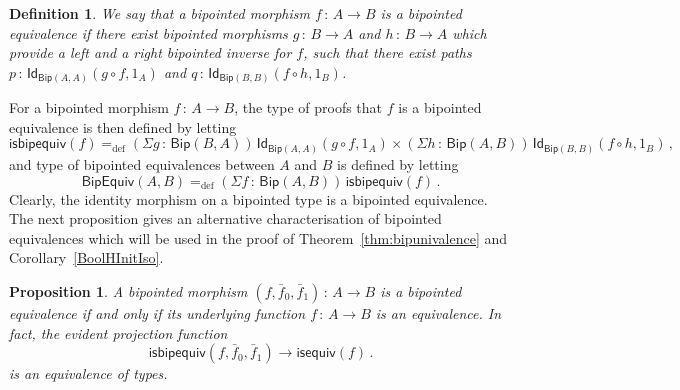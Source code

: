 \documentclass[10pt,a4paper,oneside,reqno]{amsart}
\numberwithin{equation}{section}
\theoremstyle{mythm}
\newtheorem{proposition}[theorem]{Proposition}
\theoremstyle{mydef}
\newtheorem{definition}[theorem]{Definition}
\theoremstyle{myrmk}
\newcommand{\ie}{\text{i.e.\ }}
\newcommand{\myemph}[1]{\textit{#1}}
\newcommand{\defeq}{=_{\mathrm{def}}}
\newcommand{\co}{\,{:}\,}
\newcommand{\isequiv}{\mathsf{isequiv}}
\newcommand{\Id}{\mathsf{Id}}
\newcommand{\Bip}{\mathsf{Bip}}
\newcommand{\BipHom}{\mathsf{Bip}}
\newcommand{\isbipequiv}{\mathsf{isbipequiv}}
\newcommand{\BipEquiv}{\mathsf{BipEquiv}}
\begin{document}
\begin{definition} We say that a bipointed morphism $f \co A \to B$ is a \myemph{bipointed equivalence}
if there exist bipointed morphisms $g \co B \to A$ and $h \co B \to A$ which provide a left and a right bipointed inverse for $f$, \ie such that there exist paths $p \co \Id_{\Bip(A,A)}(g \circ f, 1_A)$ 
and $q \co \Id_{\Bip(B,B)} ( f \circ h, 1_B)$.
\end{definition}

For a bipointed morphism $f \co A \to B$, the type of proofs that $f$ is a bipointed equivalence is
then defined by letting
\[
\isbipequiv(f) \defeq   (\Sigma g \co \BipHom(B,A)) \,  \Id_{\Bip(A,A)}( g\circ f, 1_A ) \times 
    (\Sigma h \co \BipHom(A, B)) \, \Id_{\Bip(B,B)} (f \circ h , 1_B ) \, ,
\]
and type of bipointed equivalences between $A$ and $B$ is defined by letting
\[
\BipEquiv(A, B)
\defeq    
(\Sigma f \co \BipHom(A,B)) \, \isbipequiv(f)  \, . 
\] 
Clearly, the identity morphism on a bipointed type is a bipointed equivalence. The next proposition
gives an alternative characterisation of bipointed equivalences which will be used
 in the proof of Theorem~\ref{thm:bipunivalence} and Corollary~\ref{BoolHInitIso}.

\begin{proposition}  \label{thm:usemere}  A bipointed morphism $(f, \bar{f}_0, \bar{f}_1) \co A \to B$ is a bipointed equivalence if and only
if its underlying function $f \co A \to B$ is an equivalence. In fact,  the evident projection function
\[
 \isbipequiv(f, \bar{f}_0, \bar{f}_1)  \to \isequiv(f) \, .
\]
is an equivalence of types. 
\end{proposition}  
\end{document}
